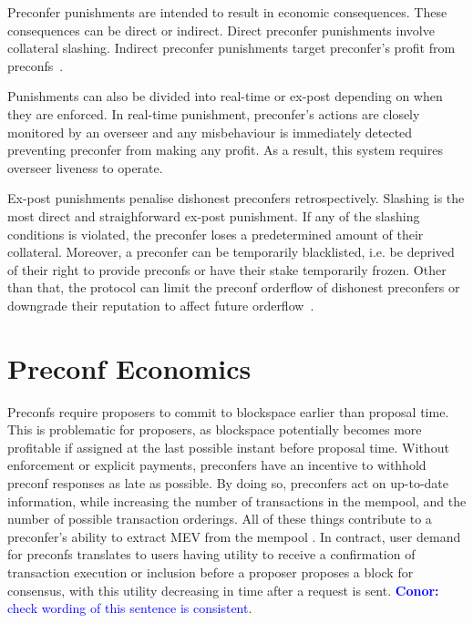 \documentclass[a4paper]{article}
\theoremstyle{boldstyle}
\newcommand{\cm}[1]{\textcolor{blue}{\textbf{Conor:} #1}}
\begin{document}
    Preconfer punishments are intended to result in economic consequences. These consequences can be direct or indirect. Direct preconfer punishments involve collateral slashing. Indirect preconfer punishments target preconfer's profit from preconfs~\cite{W:PreconfirmationFairExchange}. 
    
    Punishments can also be divided into real-time or ex-post depending on when they are enforced. In real-time punishment, preconfer's actions are closely monitored by an overseer and any misbehaviour is immediately detected preventing preconfer from making any profit. As a result, this system requires overseer liveness to operate. 
    
    Ex-post punishments penalise dishonest preconfers retrospectively. Slashing is the most direct and straighforward ex-post punishment. If any of the slashing conditions is violated, the preconfer loses a predetermined amount of their collateral. Moreover, a preconfer can be temporarily blacklisted, i.e. be deprived of their right to provide preconfs or have their stake temporarily frozen. Other than that, the protocol can limit the preconf orderflow of dishonest preconfers or downgrade their reputation to affect future orderflow~\cite{W:PreconfirmationFairExchange,W:User-DefinedPenalties:EnsuringHonestPreconfBehavior}.




\section*{Preconf Economics}
Preconfs require proposers to commit to blockspace earlier than proposal time. This is problematic for proposers, as blockspace potentially becomes more profitable if assigned at the last possible instant before proposal time. Without enforcement or explicit payments, preconfers have an incentive to withhold preconf responses as late as possible. By doing so, preconfers act on up-to-date information, while increasing the number of transactions in the mempool, and the number of possible transaction orderings. All of these things contribute to a preconfer's ability to extract MEV from the mempool \cite{W:AnalyzingBFTProposer-PromisedPreconfirmations,W:StrawmanningBasedPreconfirmations}. In contract, user demand for preconfs translates to users having utility to receive a confirmation of transaction execution or inclusion before a proposer proposes a block for consensus, with this utility decreasing in time after a request is sent. \cm{check wording of this sentence is consistent}.
\end{document}

